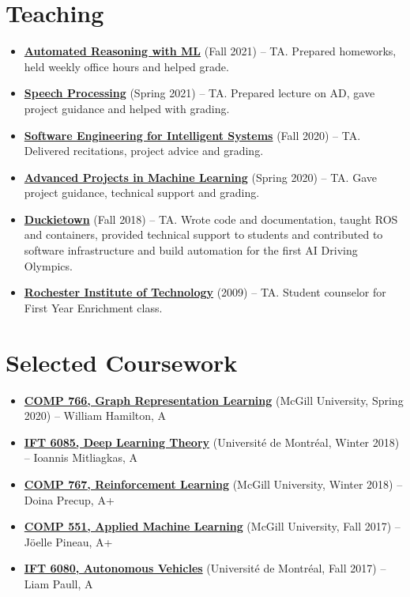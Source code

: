 \documentclass[letterpaper,11pt]{article}
\newcommand{\resumeItem}[2]{
  \item\small{\textbf{#1}{ #2 }}
}
\newcommand{\resumeSubItem}[2]{\resumeItem{#1}{#2}}
\newcommand{\resumeSubHeadingListStart}{\begin{itemize}[leftmargin=*]}
\newcommand{\resumeSubHeadingListEnd}{\end{itemize}}
\begin{document}
\begin{justify}
\section{Teaching}
\resumeSubHeadingListStart
\resumeSubItem{\href{https://www.cs.mcgill.ca/~xsi/comp-597-fall21.html}{Automated Reasoning with ML}}{(Fall 2021) -- TA. Prepared homeworks, held weekly office hours and helped grade.}
\resumeSubItem{\href{https://speechbrain.github.io}{Speech Processing}}{(Spring 2021) -- TA. Prepared lecture on AD, gave project guidance and helped with grading.}
\resumeSubItem{\href{https://github.com/jin-guo/COMP598_Fall2020}{Software Engineering for Intelligent Systems}}{(Fall 2020) -- TA. Delivered recitations, project advice and grading.}
\resumeSubItem{\href{https://admission.umontreal.ca/cours-et-horaires/cours/IFT-6759/}{Advanced Projects in Machine Learning}}{(Spring 2020) -- TA. Gave project guidance, technical support and grading.}
\resumeSubItem{\href{https://duckietown.org/}{Duckietown}}{(Fall 2018) -- TA. Wrote code and documentation, taught ROS and containers, provided technical support to students and contributed to software infrastructure and build automation for the first AI Driving Olympics.}
\resumeSubItem{\href{https://www.rit.edu}{Rochester Institute of Technology}}{(2009) -- TA. Student counselor for First Year Enrichment class.}
\resumeSubHeadingListEnd

\section{Selected Coursework}
\resumeSubHeadingListStart
\resumeSubItem{\href{https://cs.mcgill.ca/~wlh/comp766/}{COMP 766, Graph Representation Learning}}{(McGill University, Spring 2020) -- William Hamilton, A}
\resumeSubItem{\href{https://mitliagkas.github.io/ift6085-dl-theory-class/}{IFT 6085, Deep Learning Theory}}{(Universit\'e de Montr\'eal, Winter 2018) -- Ioannis Mitliagkas, A}
\resumeSubItem{\href{https://www.cs.mcgill.ca/~dprecup/courses/rl.html}{COMP 767, Reinforcement Learning}}{(McGill University, Winter 2018) -- Doina Precup, A+}
\resumeSubItem{\href{https://www.cs.mcgill.ca/~jpineau/comp551/index.html}{COMP 551, Applied Machine Learning}}{(McGill University, Fall 2017) -- J\"oelle Pineau, A+}
\resumeSubItem{\href{http://liampaull.ca/courses/duckietown/index.html}{IFT 6080, Autonomous Vehicles}}{(Universit\'e de Montr\'eal, Fall 2017) -- Liam Paull, A}
\resumeSubHeadingListEnd


\end{justify}
\end{document}
